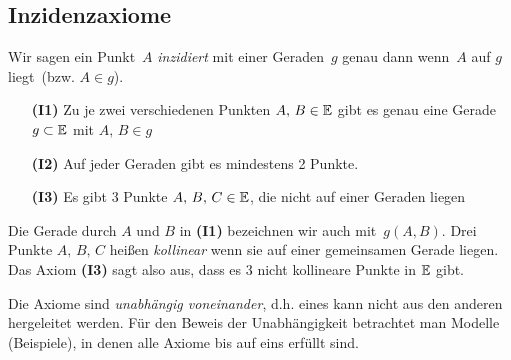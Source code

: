 



\subsection*{Inzidenzaxiome}

Wir sagen ein Punkt~$A$ {\em inzidiert} mit einer Geraden~$g$ genau dann 
wenn~$A$ \glqq auf $g$ liegt\grqq\ (bzw. $A\in g$).

\begin{enumerate}
    \item[{\bf(I1)}] Zu je zwei verschiedenen Punkten $A,\,B\in\mathbb E$ gibt es
    genau eine Gerade $g\subset\mathbb E$ mit $A,\,B\in g$
    \item[{\bf(I2)}] Auf jeder Geraden gibt es mindestens 2 Punkte.
    \item[{\bf (I3)}] Es gibt 3 Punkte $A,\,B,\,C\in\mathbb E$, die
    nicht auf einer Geraden liegen

\end{enumerate}


Die Gerade durch $A$ und $B$ in {\bf(I1)} bezeichnen wir auch
mit~$g(A,B)$. 
Drei Punkte $A,\,B,\,C$ hei{\ss}en \emph{kollinear} 
wenn sie auf einer gemeinsamen Gerade liegen.
Das Axiom {\bf(I3)} sagt also aus, dass es 3 nicht kollineare Punkte
in $\mathbb E$ gibt.


Die Axiome sind {\em unabhängig voneinander}, d.h. eines kann nicht
aus den anderen hergeleitet werden. Für den Beweis der Unabhängigkeit
betrachtet man Modelle (Beispiele), in denen alle Axiome bis
auf eins erfüllt sind.



